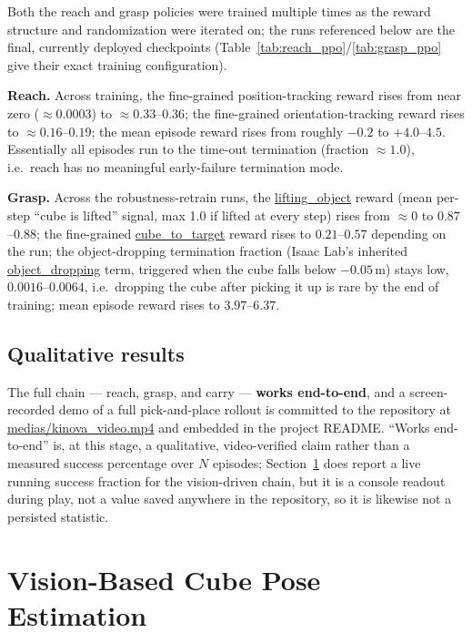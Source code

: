 \documentclass[11pt]{article}
\begin{document}
Both the reach and grasp policies were trained multiple times as the reward
structure and randomization were iterated on; the runs referenced below are the
final, currently deployed checkpoints (Table~\ref{tab:reach_ppo}/\ref{tab:grasp_ppo}
give their exact training configuration).

\textbf{Reach.} Across training, the fine-grained position-tracking reward rises
from near zero ($\approx 0.0003$) to $\approx 0.33$--$0.36$; the fine-grained
orientation-tracking reward rises to $\approx 0.16$--$0.19$; the mean episode
reward rises from roughly $-0.2$ to $+4.0$--$4.5$. Essentially all episodes run to
the time-out termination (fraction $\approx 1.0$), i.e.\ reach has no meaningful
early-failure termination mode.

\textbf{Grasp.} Across the robustness-retrain runs, the \url{lifting_object}
reward (mean per-step ``cube is lifted'' signal, max 1.0 if lifted at every step)
rises from $\approx 0$ to $0.87$--$0.88$; the fine-grained \url{cube_to_target}
reward rises to $0.21$--$0.57$ depending on the run; the object-dropping
termination fraction (Isaac Lab's inherited \url{object_dropping} term,
triggered when the cube falls below $-0.05$\,m) stays low, $0.0016$--$0.0064$, i.e.\ dropping the cube after
picking it up is rare by the end of training; mean episode reward rises to
$3.97$--$6.37$.

\subsection{Qualitative results}

The full chain --- reach, grasp, and carry --- \textbf{works end-to-end}, and a
screen-recorded demo of a full pick-and-place rollout is committed to the
repository at \url{medias/kinova_video.mp4} and embedded in the project
README. ``Works end-to-end'' is, at this stage, a qualitative, video-verified
claim rather than a measured success percentage over $N$ episodes; Section~\ref{sec:vision}
does report a live running success fraction for the vision-driven chain, but it is a
console readout during play, not a value saved anywhere in the repository, so it is
likewise not a persisted statistic.

\section{Vision-Based Cube Pose Estimation}
\label{sec:vision}
\end{document}
